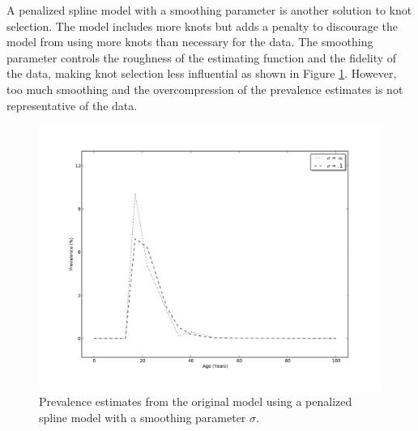 A penalized spline model with a smoothing parameter is another
solution to knot selection.  The model includes more knots but adds a
penalty to discourage the model from using more knots than necessary
for the data.  The smoothing parameter controls the roughness of the
estimating function and the fidelity of the data, making knot
selection less influential as shown in Figure
\ref{fig:app-cannabis_smoothing}.  However, too much smoothing and the
overcompression of the prevalence estimates is not representative of
the data.

    \begin{figure}[h]
        \begin{center}
            \includegraphics[width=\textwidth]{applications/cannabis_dependence-smoothing.pdf}
            \caption{Prevalence estimates from the original model
              using a penalized spline model with a smoothing
              parameter $\sigma$. }
        \label{fig:app-cannabis_smoothing}
        \end{center}
    \end{figure}

